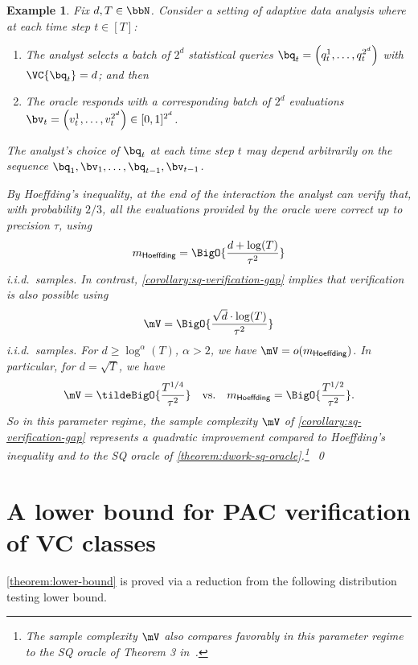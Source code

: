 \documentclass[11pt]{article}
\newtheorem{example}[theorem]{Example}
\begin{document}
\begin{example}
	Fix $d,T \in \bbN$. Consider a setting of adaptive data analysis where at each time step $t \in [T]$:
	\begin{enumerate}
		\item{
			The analyst selects a batch of $2^d$ statistical queries $\bq_t = \left(q_t^1,\dots,q_t^{2^d}\right)$ with $\VC{\bq_t} = d$; and then
		}
		\item{
			The oracle responds with a corresponding batch of $2^d$ evaluations $\bv_t = \left(v_t^1,\dots,v_t^{2^d}\right) \in [0,1]^{2^d}$.
		}
	\end{enumerate}
	The analyst's choice of $\bq_t$ at each time step $t$ may depend arbitrarily on the sequence $\bq_1,\bv_1,\dots,\allowbreak\bq_{t-1},\allowbreak\bv_{t-1}$.

	By Hoeffding's inequality, at the end of the interaction the analyst can verify that, with probability $2/3$, all the evaluations provided by the oracle were correct up to precision $\tau$, using 
	\[
		m_{\mathsf{Hoeffding}} = \BigO{\frac{d + \log(T)}{\tau^2}}
	\]
	i.i.d.\ samples. In contrast, \cref{corollary:sq-verification-gap} implies that verification is also possible using
	\[
		\mV = \BigO{
			\frac{
				\sqrt{d}\cdot \log(T)
			}{
				\tau^2
			}
		}
	\]
	i.i.d.\ samples. For $d \geq \log^\alpha(T)$, $\alpha > 2$, we have $\mV = o(m_{\mathsf{Hoeffding}})$. In particular, for $d = \sqrt{T}$, we have 
	\[
		\mV = \tildeBigO{\frac{T^{1/4}}{\tau^2}}
		 \quad \text{vs.} \quad
		m_{\mathsf{Hoeffding}} = \BigO{\frac{T^{1/2}}{\tau^2}}.
	\]
	So in this parameter regime, the sample complexity $\mV$ of \cref{corollary:sq-verification-gap} represents a quadratic improvement compared to Hoeffding's inequality and to the SQ oracle of \cref{theorem:dwork-sq-oracle}.\footnote{
		The sample complexity $\mV$ also compares favorably in this parameter regime to the SQ oracle of Theorem 3 in~\cite{DBLP:conf/stoc/DworkFHPRR15}. 
	}~\qed
\end{example}



\section{A lower bound for PAC verification of VC classes}
\label{section:lower-bound}

\cref{theorem:lower-bound} is proved via a reduction from the following distribution testing lower bound.
\end{document}
